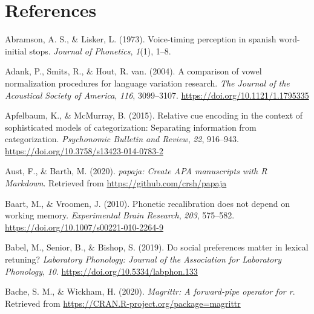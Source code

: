 \documentclass[
  11pt,
  english,
  man,floatsintext]{apa6}
\newlength{\cslhangindent}
\newlength{\cslentryspacingunit} %
\newenvironment{CSLReferences}[2] %
 {%
  \setlength{\parindent}{0pt}
  \ifodd #1
  \let\oldpar\par
  \def\par{\hangindent=\cslhangindent\oldpar}
  \fi
  \setlength{\parskip}{#2\cslentryspacingunit}
 }%
 {}
\begin{document}
\newpage

\hypertarget{references}{%
\section{References}\label{references}}

\begingroup
\setlength{\parindent}{-0.5in}
\setlength{\leftskip}{0.5in}

\hypertarget{refs}{}
\begin{CSLReferences}{1}{0}
\leavevmode{}%
Abramson, A. S., \& Lisker, L. (1973). Voice-timing perception in spanish word-initial stops. \emph{Journal of Phonetics}, \emph{1}(1), 1--8.

\leavevmode{}%
Adank, P., Smits, R., \& Hout, R. van. (2004). A comparison of vowel normalization procedures for language variation research. \emph{The Journal of the Acoustical Society of America}, \emph{116}, 3099--3107. \url{https://doi.org/10.1121/1.1795335}

\leavevmode{}%
Apfelbaum, K., \& McMurray, B. (2015). Relative cue encoding in the context of sophisticated models of categorization: Separating information from categorization. \emph{Psychonomic Bulletin and Review}, \emph{22}, 916--943. \url{https://doi.org/10.3758/s13423-014-0783-2}

\leavevmode{}%
Aust, F., \& Barth, M. (2020). \emph{{papaja}: {Create} {APA} manuscripts with {R Markdown}}. Retrieved from \url{https://github.com/crsh/papaja}

\leavevmode{}%
Baart, M., \& Vroomen, J. (2010). Phonetic recalibration does not depend on working memory. \emph{Experimental Brain Research}, \emph{203}, 575--582. \url{https://doi.org/10.1007/s00221-010-2264-9}

\leavevmode{}%
Babel, M., Senior, B., \& Bishop, S. (2019). Do social preferences matter in lexical retuning? \emph{Laboratory Phonology: Journal of the Association for Laboratory Phonology}, \emph{10}. \url{https://doi.org/10.5334/labphon.133}

\leavevmode{}%
Bache, S. M., \& Wickham, H. (2020). \emph{Magrittr: A forward-pipe operator for r}. Retrieved from \url{https://CRAN.R-project.org/package=magrittr}


\end{CSLReferences}
\end{document}
